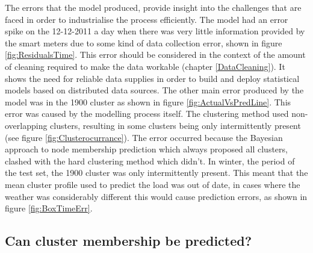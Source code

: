 The errors that the model produced, provide insight into the challenges that are faced in order to industrialise the process efficiently. The model had an error spike on the 12-12-2011 a day when there was very little information provided by the smart meters due to some kind of data collection error, shown in figure
\ref{fig:ResidualsTime}. This error should be considered in the context of the amount of cleaning required to make the data workable (chapter \ref{DataCleaning}). It shows the need for reliable data supplies in order to build and deploy statistical models based on distributed data sources. The other main error produced by the model was in the 1900 cluster as shown in figure \ref{fig:ActualVsPredLine}. This error was caused by the modelling process itself. The clustering method used non-overlapping clusters, resulting in some clusters being only intermittently present (see figure \ref{fig:Clusterocurrance}). The error occurred because the Bayesian approach to node membership prediction which always proposed all clusters, clashed with the hard clustering method which didn't. In winter, the period of the test set, the 1900 cluster was only intermittently present. This meant that the mean cluster profile used to predict the load was out of date, in cases where the weather was considerably different this would cause prediction errors, as shown in figure \ref{fig:BoxTimeErr}.

\subsection{Can cluster membership be predicted?}

